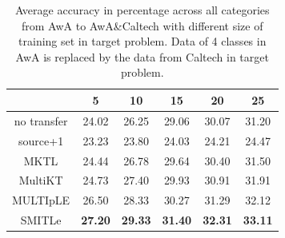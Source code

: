 \begin{table}[htbp]
  \centering
  \caption{Average accuracy in percentage across all categories from AwA to AwA\&Caltech with different size of training set in target problem. Data of 4 classes in AwA is replaced by the data from Caltech in target problem.}
    \begin{tabular}{cccccc}
    \toprule
          & 5     & 10    & 15    & 20    & 25 \\
    \midrule
    no transfer &         24.02  &         26.25  &         29.06  &         30.07  &         31.20  \\
    source+1 &         23.23  &         23.80  &         24.03  &         24.21  &         24.47  \\
    MKTL  &         24.44  &         26.78  &         29.64  &         30.40  &         31.50  \\
    MultiKT &         24.73  &         27.40  &         29.93  &         30.91  &         31.91  \\
    MULTIpLE &         26.50  &         28.33  &         30.27  &         31.29  &         32.12  \\
    SMITLe &         \textbf{27.20}  &         \textbf{29.33}  &         \textbf{31.40}  &         \textbf{32.31}  &         \textbf{33.11}  \\
    \bottomrule
    \end{tabular}%
  \label{tab:4c}%
\end{table}%

